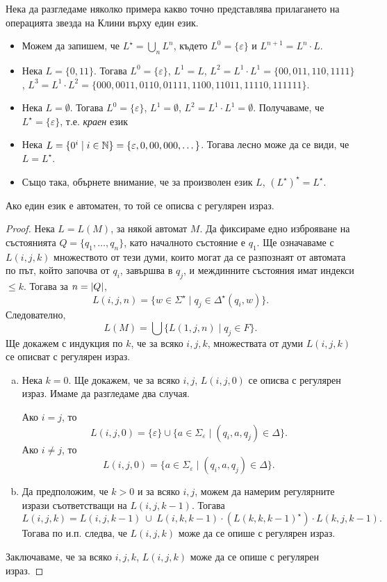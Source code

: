 \begin{example}
  Нека да разгледаме няколко примера какво точно представлява прилагането
  на операцията звезда на Клини върху един език.
  \begin{itemize}
  \item
    Можем да запишем, че $L^\star = \bigcup_n L^n$, където
    $L^0 = \{\varepsilon\}$ и $L^{n+1} = L^n\cdot L$.    
  \item 
    Нека $L = \{0,11\}$. 
    Тогава $L^0 = \{\varepsilon\}$, $L^1 = L$,
    $L^2 = L^1\cdot L^1 = \{00,011,110,1111\}$,
    $L^3 = L^1\cdot L^2 = \{000,0011,0110,01111,1100,11011,11110,111111\}$.
  \item
    Нека $L = \emptyset$.
    Тогава $L^0 = \{\varepsilon\}$, $L^1 = \emptyset$, $L^2 = L^1 \cdot L^1 = \emptyset$.
    Получаваме, че $L^\star = \{\varepsilon\}$, т.е. {\em краен} език
  \item
    Нека $L = \{0^i\mid i \in \mathbb{N}\} = \{\varepsilon, 0, 00, 000, \dots\}$.
    Тогава лесно може да се види, че $L = L^\star$.
  \item
    Също така, обърнете внимание, че за произволен език $L$,
    $(L^\star)^\star = L^\star$.
  \end{itemize}
\end{example}

\begin{lemma}
  Ако един език е автоматен, то той се описва с регулярен израз.
\end{lemma}
\begin{proof}%
  Нека  $L = L(M)$, за някой автомат $M$.
  Да фиксираме едно изброяване на състоянията $Q = \{q_1,\dots,q_n\}$,
  като началното състояние е $q_1$.
  Ще означаваме с $L(i,j,k)$ множеството от тези думи, които
  могат да се разпознаят от автомата по път, който започва от $q_i$,
  завършва в $q_j$, и междинните състояния имат индекси $\leq k$.
  Тогава за $n = \vert{Q}\vert$, 
  \[L(i,j,n) = \{w\in\Sigma^\star\mid q_j\in \Delta^\star(q_i, w)\}.\]
  Следователно,
  \[L(M) = \bigcup\{L(1,j,n)\mid q_j \in F\}.\]
  Ще докажем с индукция по $k$, че за всяко $i,j,k$, множествата от думи $L(i,j,k)$
  се описват с регулярен израз.
  \begin{enumerate}[a)]
  \item
    Нека $k = 0$. Ще докажем, че за всяко $i,j$, $L(i,j,0)$ се описва с регулярен израз.
    Имаме да разгледаме два случая.
    
    Ако $i = j$, то 
    \[L(i, j, 0) = \{\varepsilon\}\cup\{a\in\Sigma_\varepsilon\mid (q_i, a, q_j) \in \Delta\}.\]
    Ако $i \neq j$, то
    \[L(i, j, 0) = \{a\in\Sigma_\varepsilon\mid (q_i, a, q_j) \in \Delta\}.\]
  \item
    Да предположим, че $k > 0$ и за всяко $i,j$, можем да намерим регулярните изрази
    съответстващи на $L(i,j,k-1)$. Тогава
    \[L(i,j,k) = L(i,j,k-1)\ \cup\ L(i,k,k-1)\cdot (L(k,k,k-1)^\star) \cdot L(k,j,k-1).\]
    Тогава по и.п. следва, че $L(i,j,k)$ може да се опише с регулярен израз.
  \end{enumerate}
  Заключаваме, че за всяко $i,j,k$, $L(i,j,k)$ може да се опише с регулярен израз.
\end{proof}

